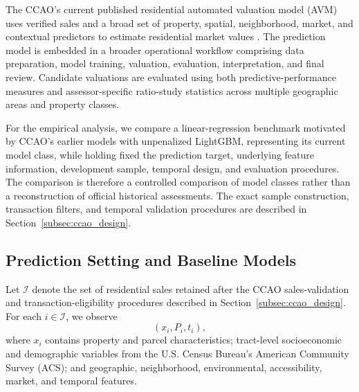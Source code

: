 \documentclass[10pt]{article}
\theoremstyle{definition}
\newcommand{\1}{\mathbf{1}}
\begin{document}
The CCAO's current published residential automated valuation model (AVM) uses verified sales and a broad set of property, spatial, neighborhood, market, and contextual predictors to estimate residential market values \cite{CCAOModelResAVM2026}. The prediction model is embedded in a broader operational workflow comprising data preparation, model training, valuation, evaluation, interpretation, and final review. Candidate valuations are evaluated using both predictive-performance measures and assessor-specific ratio-study statistics across multiple geographic areas and property classes.


{For the empirical analysis, we compare a linear-regression benchmark motivated by CCAO's earlier models with unpenalized LightGBM, representing its current model class, while holding fixed the prediction target, underlying feature information, development sample, temporal design, and evaluation procedures.}
The comparison is therefore a controlled comparison of model classes rather than a reconstruction of official historical assessments. The exact sample construction, transaction filters, and temporal validation procedures are described in Section~\ref{subsec:ccao_design}.


\subsection{Prediction Setting and Baseline Models}
\label{subsec:baseline_models}

Let $\mathcal{I}$ denote the set of residential sales retained after the CCAO sales-validation and transaction-eligibility procedures described in Section~\ref{subsec:ccao_design}. For each $i\in\mathcal{I}$, we observe
\[
(x_i,P_i,t_i),
\]
where $x_i$ contains property and parcel characteristics; tract-level socioeconomic and demographic variables from the U.S. Census Bureau's American Community Survey (ACS); and geographic, neighborhood, environmental, accessibility, market, and temporal features.

\end{document}
